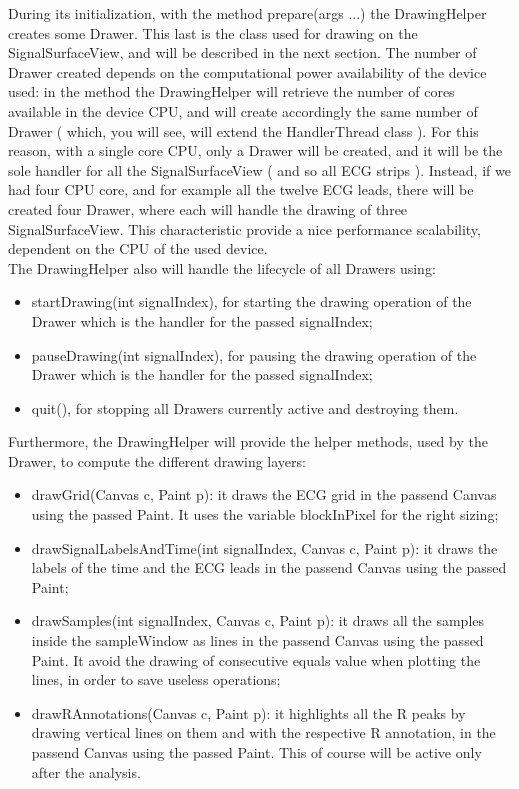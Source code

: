During its initialization, with the method prepare(args ...) the DrawingHelper creates some Drawer. This last is the class used for drawing on the SignalSurfaceView, and will be described in the next section. The number of Drawer created depends on the computational power availability of the device used: in the method the DrawingHelper will retrieve the number of cores available in the device CPU, and will create accordingly the same number of  Drawer ( which, you will see, will extend the HandlerThread class ). For this reason, with a single core CPU, only a Drawer will be created, and it will be the sole handler for all the SignalSurfaceView ( and so all ECG strips ). Instead, if we had four CPU core, and for example all the twelve ECG leads, there will be created four Drawer, where each will handle the drawing of three SignalSurfaceView. This characteristic provide a nice performance scalability, dependent on the CPU of the used device.\\
The DrawingHelper also will handle the lifecycle of all Drawers using:
\begin{itemize}
	\item startDrawing(int signalIndex), for starting the drawing operation of the Drawer which is the handler for the passed signalIndex;
	\item pauseDrawing(int signalIndex), for pausing the drawing operation of the Drawer which is the handler for the passed signalIndex;
	\item quit(), for stopping all Drawers currently active and destroying them.
\end{itemize}
Furthermore, the DrawingHelper will provide the helper methods, used by the Drawer, to compute the different drawing layers:
\begin{itemize}
	\item drawGrid(Canvas c, Paint p): it draws the ECG grid in the passend Canvas using the passed Paint. It uses the variable blockInPixel for the right sizing;
	\item drawSignalLabelsAndTime(int signalIndex, Canvas c, Paint p): it draws the labels of the time and the ECG leads in the passend Canvas using the passed Paint;
	\item drawSamples(int signalIndex, Canvas c, Paint p): it draws all the samples inside the sampleWindow as lines in the passend Canvas using the passed Paint. It avoid the drawing of consecutive equals value when plotting the lines, in order to save useless operations;
	\item drawRAnnotations(Canvas c, Paint p): it highlights all the R peaks by drawing vertical lines on them and with the respective R annotation, in the passend Canvas using the passed Paint. This of course will be active only after the analysis.
\end{itemize}

